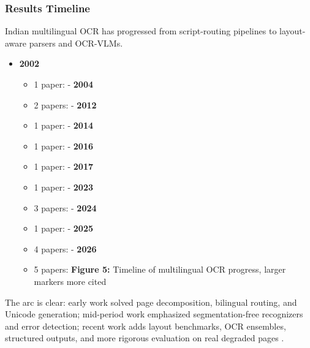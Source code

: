     
    \subsubsection*{Results Timeline}
    
    
    Indian multilingual OCR has progressed from script-routing pipelines to layout-aware parsers and OCR-VLMs.
    
    
    \begin{itemize}
    \item \textbf{2002}\begin{itemize}
    \item 1 paper:  \cite{Chaudhuri2002Page}- \textbf{2004}
    \item 2 papers:  \cite{Govindaraju2004Tools} \cite{Pati2004Gabor}- \textbf{2012}
    \item 1 paper:  \cite{Kumar2012Discrimination}- \textbf{2014}
    \item 1 paper:  \cite{Sarungbam2014Script}- \textbf{2016}
    \item 1 paper:  \cite{Mathew2016Multilingual}- \textbf{2017}
    \item 1 paper:  \cite{Saluja2017A}- \textbf{2023}
    \item 3 papers:  \cite{Zulkarnain2023bbOCR:} \cite{Madhani2023Bhasa-Abhijnaanam:} \cite{Fateh2023Enhancing}- \textbf{2024}
    \item 1 paper:  \cite{Tulsyan2024IndicOCR:}- \textbf{2025}
    \item 4 papers:  \cite{Li2025Printed} \cite{Nath2025IndicDLP:} \cite{Jayatilleke2025Zero-shot} \cite{Manukonda2025byteSizedLLM@NLU}- \textbf{2026}
    \item 5 papers:  \cite{Faraz2026Designing} \cite{Bhandari2026A} \cite{Singh2026Can} \cite{Zilani2026A} \cite{Jhala2026PragyaDoc:}\textbf{Figure 5:} Timeline of multilingual OCR progress, larger markers more cited
    \end{itemize}
    
    
    \end{itemize}
    
    
    The arc is clear: early work solved page decomposition, bilingual routing, and Unicode generation; mid-period work emphasized segmentation-free recognizers and error detection; recent work adds layout benchmarks, OCR ensembles, structured outputs, and more rigorous evaluation on real degraded pages  \cite{Chaudhuri1997An} \cite{Krishnan2014Towards} \cite{Vinitha2016Error} \cite{Nath2025IndicDLP:} \cite{Singh2026Can}.
    
